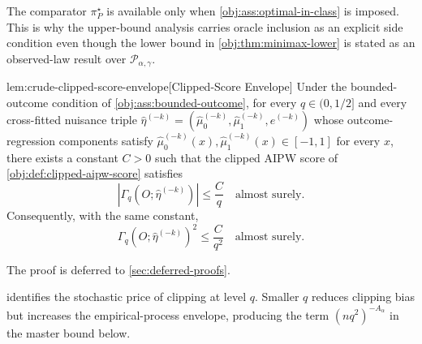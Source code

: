 \documentclass[11pt]{article}
\begin{document}
The comparator \(\pi^\star_P\) is available only when \cref{obj:ass:optimal-in-class} is imposed.  This is why the upper-bound analysis carries oracle inclusion as an explicit side condition even though the lower bound in \cref{obj:thm:minimax-lower} is stated as an observed-law result over \(\mathcal P_{\alpha,\gamma}\).

\begin{lemmav}{lem:crude-clipped-score-envelope}[Clipped-Score Envelope]
Under the bounded-outcome condition of \cref{obj:ass:bounded-outcome}, for every \(q\in(0,1/2]\) and every cross-fitted nuisance triple \(\widehat\eta^{(-k)}=(\widehat\mu_0^{(-k)},\widehat\mu_1^{(-k)},\widehat e^{(-k)})\) whose outcome-regression components satisfy \(\widehat\mu_0^{(-k)}(x),\widehat\mu_1^{(-k)}(x)\in[-1,1]\) for every \(x\), there exists a constant \(C>0\) such that the clipped AIPW score of \cref{obj:def:clipped-aipw-score} satisfies
\[
\left|\Gamma_q\!\left(O;\widehat\eta^{(-k)}\right)\right|\le \frac{C}{q}
\quad\text{almost surely}.
\]
Consequently, with the same constant,
\[
\Gamma_q\!\left(O;\widehat\eta^{(-k)}\right)^2
\le \frac{C}{q^2}
\quad\text{almost surely}.
\]
\end{lemmav}

The proof is deferred to \cref{sec:deferred-proofs}.

 identifies the stochastic price of clipping at level \(q\).  Smaller \(q\) reduces clipping bias but increases the empirical-process envelope, producing the term \((nq^2)^{-A_\alpha}\) in the master bound below.
\end{document}
